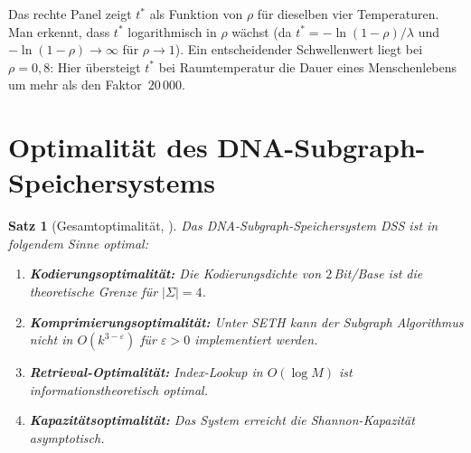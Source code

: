 ﻿\documentclass[a4paper,12pt]{article}
\theoremstyle{definition}
\theoremstyle{plain}
\newtheorem{satz}{Satz}[section]
\begin{document}
Das rechte Panel zeigt $t^*$ als Funktion von $\rho$ für dieselben vier
Temperaturen.  Man erkennt, dass $t^*$ logarithmisch in $\rho$ wächst
(da $t^* = -\ln(1-\rho)/\lambda$ und $-\ln(1-\rho) \to \infty$ für
$\rho \to 1$).  Ein entscheidender Schwellenwert liegt bei $\rho = 0{,}8$:
Hier übersteigt $t^*$ bei Raumtemperatur die Dauer eines Menschenlebens
um mehr als den Faktor~$20\,000$.

\section{Optimalität des DNA-Subgraph-Speichersystems}
\label{sec:optimalitaet}

\begin{satz}[Gesamtoptimalität, \cite{dnastor}]
\label{satz:optimalitaet}
  Das DNA-Subgraph-Speichersystem DSS ist in folgendem Sinne optimal:
  \begin{enumerate}
    \item \textbf{Kodierungsoptimalität:} Die Kodierungsdichte von
          $2$\,Bit/Base ist die theoretische Grenze für $|\Sigma|=4$.
    \item \textbf{Komprimierungsoptimalität:} Unter SETH kann der
          Subgraph Algorithmus nicht in $O(k^{3-\varepsilon})$ für
          $\varepsilon > 0$ implementiert werden.
    \item \textbf{Retrieval-Optimalität:} Index-Lookup in $O(\log M)$
          ist informationstheoretisch optimal.
    \item \textbf{Kapazitätsoptimalität:} Das System erreicht die
          Shannon-Kapazität asymptotisch.
  \end{enumerate}
\end{satz}
\end{document}
